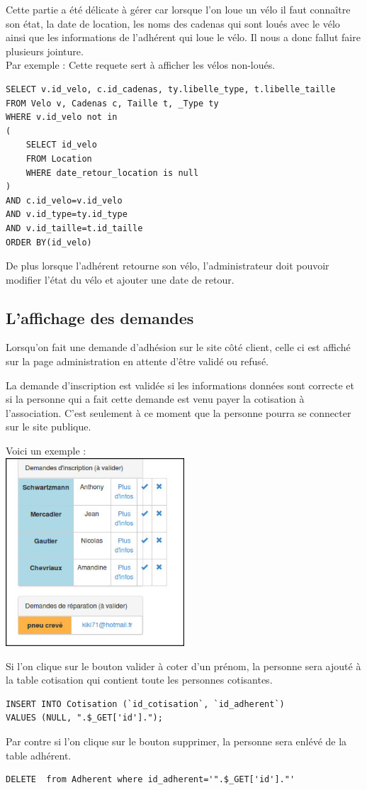 \documentclass[11pt,a4paper,titlepage]{report}
\begin{document}
Cette partie a été délicate à gérer car lorsque l'on loue un vélo il faut connaître son état, la date de location, les noms des cadenas qui sont loués avec le vélo ainsi que les informations de l'adhérent qui loue le vélo. Il nous a donc fallut faire plusieurs jointure.\\

Par exemple : Cette requete sert à afficher les vélos non-loués. 
\begin{verbatim}
SELECT v.id_velo, c.id_cadenas, ty.libelle_type, t.libelle_taille
FROM Velo v, Cadenas c, Taille t, _Type ty 
WHERE v.id_velo not in
(
    SELECT id_velo 
    FROM Location 
    WHERE date_retour_location is null
)
AND c.id_velo=v.id_velo
AND v.id_type=ty.id_type
AND v.id_taille=t.id_taille
ORDER BY(id_velo) 
\end{verbatim} 

De plus lorsque l'adhérent retourne son vélo, l'administrateur doit pouvoir modifier l'état du vélo et ajouter une date de retour. 

\subsection{L'affichage des demandes}
Lorsqu'on fait une demande d'adhésion sur le site côté client, celle ci est affiché sur la page administration en attente d'être validé ou refusé.

La demande d'inscription est validée si les informations données sont correcte et si la personne qui a fait cette demande est venu payer la cotisation à l'association. C'est seulement à ce moment que la personne pourra se connecter sur le site publique.

Voici un exemple :\\
\includegraphics[width=0.5\textwidth]{demande.jpg}~

Si l'on clique sur le bouton valider à coter d'un prénom, la personne sera ajouté à la table cotisation qui contient toute les personnes cotisantes.
\begin{verbatim}
INSERT INTO Cotisation (`id_cotisation`, `id_adherent`)
VALUES (NULL, ".$_GET['id'].");
\end{verbatim} 
Par contre si l'on clique sur le bouton supprimer, la personne sera enlévé de la table adhérent.
\begin{verbatim}
DELETE  from Adherent where id_adherent='".$_GET['id']."'
\end{verbatim}
\end{document}
